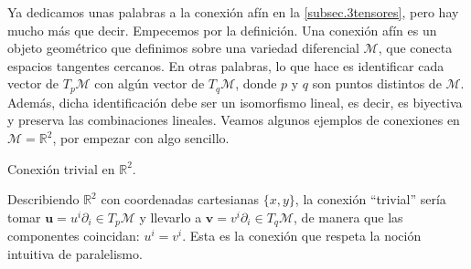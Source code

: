 Ya dedicamos unas palabras a la conexión afín en la \cref{subsec.3tensores}, pero hay mucho más que decir. Empecemos por la definición. Una conexión afín es un objeto geométrico que definimos sobre una variedad diferencial \(\mathcal{M}\), que conecta espacios tangentes cercanos. En otras palabras, lo que hace es identificar cada vector de \(T_p\mathcal{M}\) con algún vector de \(T_q\mathcal{M}\), donde \(p\) y \(q\) son puntos distintos de \(\mathcal{M}\). Además, dicha identificación debe ser un isomorfismo lineal, es decir, es biyectiva y preserva las combinaciones lineales. Veamos algunos ejemplos de conexiones en \(\mathcal{M} = \mathbb{R}^2\), por empezar con algo sencillo.

\begin{example}
    {Conexión trivial en \(\mathbb{R}^2\).
    \label{ej.4-conexion_trivialR2}}

    Describiendo \(\mathbb{R}^2\) con coordenadas cartesianas \(\{x, y\}\), la conexión ``trivial'' sería tomar \(\mathbf{u} = u^i\partial_i\in T_p\mathcal{M}\) y llevarlo a \(\mathbf{v} = v^i\partial_i\in T_q\mathcal{M}\), de manera que las componentes coincidan: \(u^i = v^i\). Esta es la conexión que respeta la noción intuitiva de paralelismo. 


\end{example}
